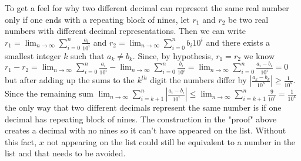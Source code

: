 \documentclass[12pt]{article}
\begin{document}
To get a feel for why two different decimal can represent
the same real number only if one ends with a repeating
block of nines, let $r_1$ and $r_2$ be two real numbers with 
different decimal representations. Then we can write 
$r_1=\lim_{n\to\infty} \sum_{i=0}^{n}\frac{a_i}{10^i}$
and $r_2=\lim_{n\to\infty}\sum_{i=0}^{n}{b_i}{10^i}$
and there exists a smallest integer $k$ such that 
$a_k\neq b_k$. Since, by hypothesis, $r_1=r_2$ we know 
$r_1-r_2=\lim_{n\to\infty}\sum_{i=0}^{n}\frac{a_i}{10^i}-
\lim_{n\to\infty}\sum_{i=0}^{n}\frac{b_i}{10^i}=
\lim_{n\to\infty}\sum_{i=0}^{n}\frac{a_i-b_i}{10^i}=0$
but after adding up the sums to the $k^{th}$ digit the 
numbers differ by $\left|\frac{a_k-b_k}{10^k}\right|\geq\frac{1}{10^k}$. Since the remaining sum 
$\lim_{n\to\infty}\sum_{i=k+1}^{n}\left|\frac{a_i-b_i}{10^i}\right|
\leq  \lim_{n\to\infty}\sum_{i=k+1}^{n}\frac{9}{10^i}=\frac{1}{10^k}$ the only way that two different decimals
represent the same number is if one decimal has repeating
block of nines. The construction in the "proof" above 
creates a decimal with no nines so it can't have appeared on
the list. Without this fact, $x$ not appearing on the list could
still be equivalent to a number in the list and that needs to
be avoided.
\end{document}
